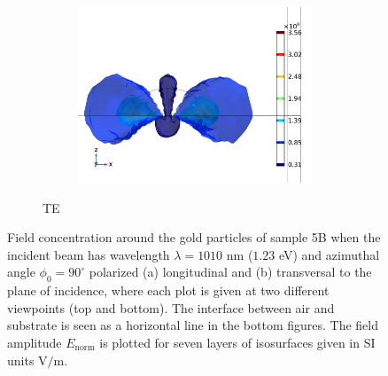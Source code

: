 \begin{figure}[h]
\begin{subfigure}{0.49\textwidth}
    \begin{subfigure}{\textwidth}
        \centering
        \includegraphics[width=0.9\linewidth]{figures/ch4/S5B/fielddistr/s5b_normE_TE_wl1010_phi90(1).png}
    \end{subfigure}
    \caption{TE}
    \end{subfigure}
    \caption{Field concentration around the gold particles of sample 5B when the incident beam has wavelength $\lambda=1010$ nm ($1.23$ eV) and azimuthal angle $\phi_0=90^\circ$ polarized (a) longitudinal and (b) transversal to the plane of incidence, where each plot is given at two different viewpoints (top and bottom). The interface between air and substrate is seen as a horizontal line in the bottom figures. The field amplitude $E_\text{norm}$ is plotted for seven layers of isosurfaces given in SI units V$/$m.}
    \label{fig:S5B_fielddstribution_LSPR_phi90}
\end{figure}
